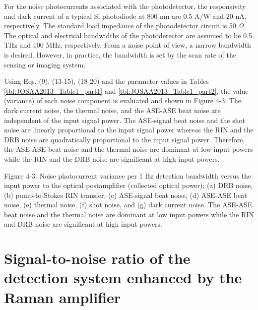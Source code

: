 For the noise photocurrents associated with the photodetector, the responsivity and dark current of a typical Si photodiode at 800 nm are 0.5 A/W and 20 nA, respectively. The standard load impedance of the photodetector circuit is 50 $\Omega$. The optical and electrical bandwidths of the photodetector are assumed to be 0.5 THz and 100 MHz, respectively. From a noise point of view, a narrow bandwidth is desired. However, in practice, the bandwidth is set by the scan rate of the sensing or imaging system.

Using Eqs. (9), (13-15), (18-20) and the parameter values in Tables \ref{tbl:JOSAA2013_Table1_part1} and \ref{tbl:JOSAA2013_Table1_part2}, the value (variance) of each noise component is evaluated and shown in Figure 4-3. The dark current noise, the thermal noise, and the ASE-ASE beat noise are independent of the input signal power. The ASE-signal beat noise and the shot noise are linearly proportional to the input signal power whereas the RIN and the DRB noise are quadratically proportional to the input signal power. Therefore, the ASE-ASE beat noise and the thermal noise are dominant at low input powers while the RIN and the DRB noise are significant at high input powers.

Figure 4-3.  Noise photocurrent variance per 1 Hz detection bandwidth versus the input power to the optical postamplifier (collected optical power); (a) DRB noise, (b) pump-to-Stokes RIN transfer, (c) ASE-signal beat noise, (d) ASE-ASE beat noise, (e) thermal noise, (f) shot noise, and (g) dark current noise. The ASE-ASE beat noise and the thermal noise are dominant at low input powers while the RIN and DRB noise are significant at high input powers.

\section{Signal-to-noise ratio of the detection system enhanced by the Raman amplifier}

